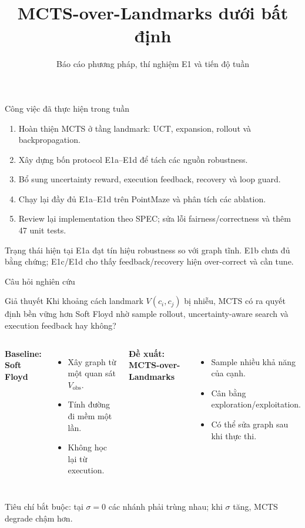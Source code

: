 \documentclass[aspectratio=169,10pt]{beamer}
\title{MCTS-over-Landmarks dưới bất định}
\subtitle{Báo cáo phương pháp, thí nghiệm E1 và tiến độ tuần}
\author{\StudentName}
\institute{GVHD: \AdvisorName}
\date{\ReportWeek}
\begin{document}
\begin{frame}
  \titlepage
\end{frame}

\begin{frame}{Công việc đã thực hiện trong tuần}
  \begin{enumerate}
    \item Hoàn thiện MCTS ở tầng landmark: UCT, expansion, rollout và backpropagation.
    \item Xây dựng bốn protocol E1a--E1d để tách các nguồn robustness.
    \item Bổ sung uncertainty reward, execution feedback, recovery và loop guard.
    \item Chạy lại đầy đủ E1a--E1d trên PointMaze và phân tích các ablation.
    \item Review lại implementation theo SPEC; sửa lỗi fairness/correctness và thêm
          \alert{47 unit tests}.
  \end{enumerate}

  \begin{block}{Trạng thái hiện tại}
    E1a đạt tín hiệu robustness so với graph tĩnh. E1b chưa đủ bằng chứng;
    E1c/E1d cho thấy feedback/recovery hiện over-correct và cần tune.
  \end{block}
\end{frame}

\begin{frame}{Câu hỏi nghiên cứu}
  \begin{block}{Giả thuyết}
    Khi khoảng cách landmark $V(c_i,c_j)$ bị nhiễu, MCTS có ra quyết định
    bền vững hơn Soft Floyd nhờ sample rollout, uncertainty-aware search và
    execution feedback hay không?
  \end{block}

  \vspace{0.5em}
  \begin{columns}[T]
      \textbf{Baseline: Soft Floyd}
      \begin{itemize}
        \item Xây graph từ một quan sát $V_{\mathrm{obs}}$.
        \item Tính đường đi mềm một lần.
        \item Không học lại từ execution.
      \end{itemize}
      \textbf{Đề xuất: MCTS-over-Landmarks}
      \begin{itemize}
        \item Sample nhiều khả năng của cạnh.
        \item Cân bằng exploration/exploitation.
        \item Có thể sửa graph sau khi thực thi.
      \end{itemize}
  \end{columns}

  \vspace{0.4em}
  \centering
  \alert{Tiêu chí bắt buộc: tại $\sigma=0$ các nhánh phải trùng nhau;
  khi $\sigma$ tăng, MCTS degrade chậm hơn.}
\end{frame}
\end{document}
